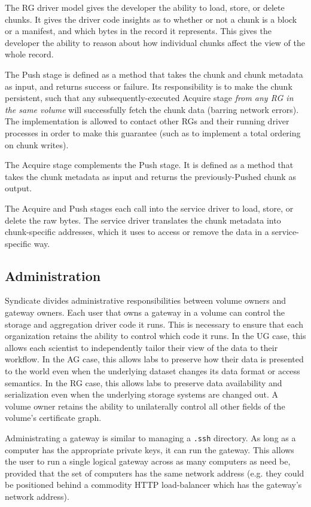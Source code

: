   The RG driver model gives the developer
the ability to load, store, or delete chunks.  It gives the driver code insights
as to whether or not a chunk is a block or a manifest, and which bytes in the
record it represents.  This gives the developer the ability to reason about how
individual chunks affect the view of the whole record.

The Push stage is defined as a method that takes the chunk and chunk metadata as
input, and returns success or failure.  Its responsibility is to make the chunk
persistent, such that any subsequently-executed Acquire stage \textit{from any
RG in the same volume} will successfully fetch the chunk data (barring network
errors).  The implementation is allowed to contact other RGs and their running
driver processes in order to make this guarantee (such as to implement a total
ordering on chunk writes).

The Acquire stage complements the Push stage.  It is defined as a method that
takes the chunk metadata as input and returns the previously-Pushed chunk as
output.

  The Acquire and Push stages each call into
the service driver to load, store, or delete the raw bytes.  The service driver
translates the chunk metadata into chunk-specific addresses, which it uses to
access or remove the data in a service-specific way.

\subsection{Administration}

Syndicate divides administrative responsibilities between volume owners and
gateway owners.  Each user that owns a gateway in a volume can control the
storage and aggregation driver code it runs.  This is necessary to ensure that
each organization retains the ability to control which code it runs.
In the UG case, this allows each
scientist to independently tailor their view of the data to their workflow.  In
the AG case, this allows labs to preserve how their data is presented to the
world even when the underlying dataset changes its data format or access
semantics.  In the RG case, this allows labs to preserve data availability and
serialization even when the underlying storage systems are changed out.
A volume owner retains the ability to unilaterally control all other fields of
the volume's certificate graph.

Administrating a gateway is similar to managing a \texttt{.ssh} directory.  As
long as a computer has the appropriate private keys, it can run the gateway.  This
allows the user to run a single logical gateway across as many computers as need
be, provided that the set of computers has the same network address (e.g. they
could be positioned behind a commodity HTTP load-balancer which has the gateway's network
address).

